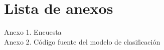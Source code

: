 \chapter*{Lista de anexos}

\noindent Anexo 1. Encuesta  \\
\noindent Anexo 2. Código fuente del modelo de clasificación  \\
\\


